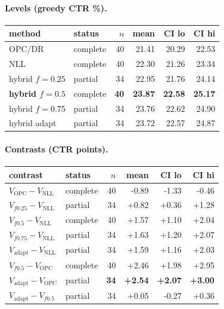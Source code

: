 \documentclass[10pt,a4paper]{article}
\begin{document}
\paragraph{Levels (greedy CTR \%).}
{\centering\small\begin{tabular}{llrrrr}
\toprule method & status & $n$ & mean & CI lo & CI hi \\
\midrule
OPC/DR & complete & 40 & 21.41 & 20.29 & 22.53 \\
NLL & complete & 40 & 22.30 & 21.26 & 23.34 \\
hybrid $f{=}0.25$ & partial & 34 & 22.95 & 21.76 & 24.14 \\
\textbf{hybrid $f{=}0.5$} & complete & \textbf{40} & \textbf{23.87} & \textbf{22.58} & \textbf{25.17} \\
hybrid $f{=}0.75$ & partial & 34 & 23.76 & 22.62 & 24.90 \\
hybrid adapt & partial & 34 & 23.72 & 22.57 & 24.87 \\
\bottomrule\end{tabular}\par}
\paragraph{Contrasts (CTR points).}
{\centering\small\begin{tabular}{llrrrr}
\toprule contrast & status & $n$ & mean & CI lo & CI hi \\
\midrule
$V_{\mathrm{OPC}}-V_{\mathrm{NLL}}$ & complete & 40 & -0.89 & -1.33 & -0.46 \\
$V_{f0.25}-V_{\mathrm{NLL}}$ & partial & 34 & +0.82 & +0.36 & +1.28 \\
$V_{f0.5}-V_{\mathrm{NLL}}$ & complete & 40 & +1.57 & +1.10 & +2.04 \\
$V_{f0.75}-V_{\mathrm{NLL}}$ & partial & 34 & +1.63 & +1.20 & +2.07 \\
$V_{\mathrm{adapt}}-V_{\mathrm{NLL}}$ & partial & 34 & +1.59 & +1.16 & +2.03 \\
$V_{f0.5}-V_{\mathrm{OPC}}$ & complete & 40 & +2.46 & +1.98 & +2.95 \\
\textbf{$V_{\mathrm{adapt}}-V_{\mathrm{OPC}}$} & partial & \textbf{34} & \textbf{+2.54} & \textbf{+2.07} & \textbf{+3.00} \\
$V_{\mathrm{adapt}}-V_{f0.5}$ & partial & 34 & +0.05 & -0.27 & +0.36 \\
\bottomrule\end{tabular}\par}
\end{document}

